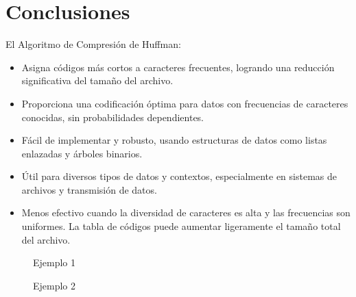 \documentclass{article}
\begin{document}

  \section{Conclusiones}
  El Algoritmo de Compresión de Huffman:
  \begin{itemize}
    \item Asigna códigos más cortos a caracteres frecuentes, logrando una 
    reducción significativa del tamaño del archivo.
    \item Proporciona una codificación óptima para datos con frecuencias de caracteres conocidas, sin probabilidades 
    dependientes.
    \item Fácil de implementar y robusto, usando estructuras de datos como listas enlazadas y árboles binarios.
    \item Útil para diversos tipos de datos y contextos, especialmente en sistemas de archivos y transmisión de datos.
    \item Menos efectivo cuando la diversidad de caracteres es alta y las frecuencias son uniformes. La tabla de códigos puede aumentar 
    ligeramente el tamaño total del archivo.
  \end{itemize}
  \begin{figure}[H]
    \centering
    \caption{Ejemplo 1}
  \end{figure}
  \begin{figure}[H]
    \centering
    \caption{Ejemplo 2}
  \end{figure}
\end{document}
